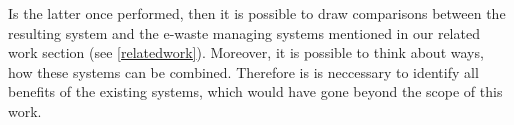 Is the latter once performed, then it is possible to draw comparisons between the resulting system and the e-waste managing systems mentioned in our related work section (see \ref{relatedwork}). Moreover, it is possible to think about ways, how these systems can be combined. Therefore is is neccessary to identify all benefits of the existing systems, which would have gone beyond the scope of this work.
